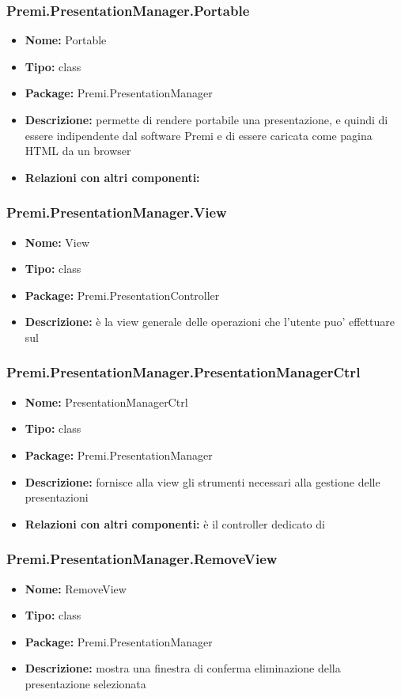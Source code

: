 \subsubsection{Premi.PresentationManager.Portable}
\begin{itemize}
  \item \textbf{Nome:} Portable
  \item \textbf{Tipo:} class
  \item \textbf{Package:} Premi.PresentationManager
  \item \textbf{Descrizione:} permette di rendere portabile una presentazione, e quindi di essere indipendente dal software Premi e di essere caricata come pagina HTML da un browser
  \item \textbf{Relazioni con altri componenti:} 
\end{itemize}
\subsubsection{Premi.PresentationManager.View}
\begin{itemize}
  \item \textbf{Nome:} View
  \item \textbf{Tipo:} class
  \item \textbf{Package:} Premi.PresentationController
  \item \textbf{Descrizione:} è la view generale delle operazioni che l'utente puo' effettuare sul
\end{itemize}
\subsubsection{Premi.PresentationManager.PresentationManagerCtrl}
\begin{itemize}
  \item \textbf{Nome:} PresentationManagerCtrl
  \item \textbf{Tipo:} class
  \item \textbf{Package:} Premi.PresentationManager
  \item \textbf{Descrizione:} fornisce alla view gli strumenti necessari alla gestione delle presentazioni
  \item \textbf{Relazioni con altri componenti:} è il controller dedicato di   
\end{itemize}
\subsubsection{Premi.PresentationManager.RemoveView}
\begin{itemize}
  \item \textbf{Nome:} RemoveView
  \item \textbf{Tipo:} class
  \item \textbf{Package:} Premi.PresentationManager
  \item \textbf{Descrizione:} mostra una finestra di conferma eliminazione della presentazione selezionata
\end{itemize}
